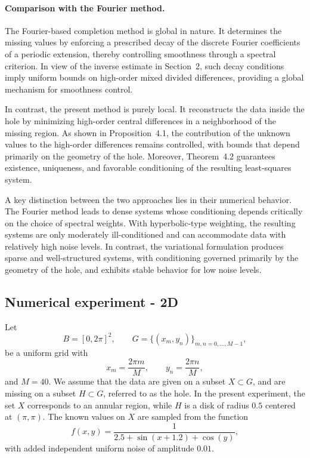 \documentclass[11pt,oneside,reqno]{amsart}
\theoremstyle{plain}
\numberwithin{equation}{section}
\begin{document}
\paragraph{\bf Comparison with the Fourier method.}\hfill

\medskip

The Fourier-based completion method is global in nature.  
It determines the missing values by enforcing a prescribed decay  
of the discrete Fourier coefficients of a periodic extension,  
thereby controlling smoothness through a spectral criterion.  
In view of the inverse estimate in Section~2,  
such decay conditions imply uniform bounds  
on high-order mixed divided differences,  
providing a global mechanism for smoothness control.

In contrast, the present method is purely local.  
It reconstructs the data inside the hole  
by minimizing high-order central differences  
in a neighborhood of the missing region.  
As shown in Proposition~4.1,  
the contribution of the unknown values  
to the high-order differences remains controlled,  
with bounds that depend primarily  
on the geometry of the hole.  
Moreover, Theorem~4.2 guarantees  
existence, uniqueness, and favorable conditioning  
of the resulting least-squares system.

A key distinction between the two approaches  
lies in their numerical behavior.  
The Fourier method leads to dense systems  
whose conditioning depends critically  
on the choice of spectral weights.  
With hyperbolic-type weighting,  
the resulting systems are only moderately ill-conditioned  
and can accommodate data with relatively high noise levels.  
In contrast, the variational formulation  
produces sparse and well-structured systems,  
with conditioning governed primarily  
by the geometry of the hole,  
and exhibits stable behavior  
for low noise levels.



\subsection{ Numerical experiment - 2D}\hfill

Let
\[
B=[0,2\pi]^2,
\qquad
G=\{(x_m,y_n)\}_{m,n=0,\ldots,M-1},
\]
be a uniform grid with
\[
x_m=\frac{2\pi m}{M},
\qquad
y_n=\frac{2\pi n}{M},
\]
and $M=40$.
We assume that the data are given on a subset $X\subset G$, and are
missing on a subset $H\subset G$, referred to as the hole.
In the present experiment, the set $X$ corresponds to an annular region,
while $H$ is a disk of radius $0.5$ centered at $(\pi,\pi)$.
The known values on $X$  
are sampled from the function
\[
f(x,y)=\frac{1}{2.5+\sin(x+1.2)+\cos(y)},
\]
with added independent uniform noise  
of amplitude $0.01$.
\end{document}
